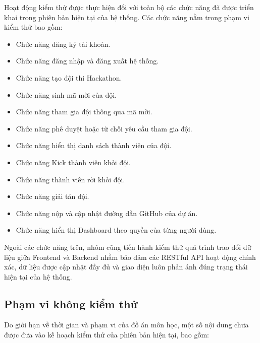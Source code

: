 Hoạt động kiểm thử được thực hiện đối với toàn bộ các chức năng đã được triển khai trong phiên bản hiện tại của hệ thống. Các chức năng nằm trong phạm vi kiểm thử bao gồm:

\begin{itemize}
	\item Chức năng đăng ký tài khoản.
	
	\item Chức năng đăng nhập và đăng xuất hệ thống.
	
	\item Chức năng tạo đội thi Hackathon.
	
	\item Chức năng sinh mã mời của đội.
	
	\item Chức năng tham gia đội thông qua mã mời.
	
	\item Chức năng phê duyệt hoặc từ chối yêu cầu tham gia đội.
	
	\item Chức năng hiển thị danh sách thành viên của đội.
	
	\item Chức năng Kick thành viên khỏi đội.
	
	\item Chức năng thành viên rời khỏi đội.
	
	\item Chức năng giải tán đội.
	
	\item Chức năng nộp và cập nhật đường dẫn GitHub của dự án.
	
	\item Chức năng hiển thị Dashboard theo quyền của từng người dùng.
\end{itemize}

Ngoài các chức năng trên, nhóm cũng tiến hành kiểm thử quá trình trao đổi dữ liệu giữa Frontend và Backend nhằm bảo đảm các RESTful API hoạt động chính xác, dữ liệu được cập nhật đầy đủ và giao diện luôn phản ánh đúng trạng thái hiện tại của hệ thống.

\subsection{Phạm vi không kiểm thử}

Do giới hạn về thời gian và phạm vi của đồ án môn học, một số nội dung chưa được đưa vào kế hoạch kiểm thử của phiên bản hiện tại, bao gồm:

